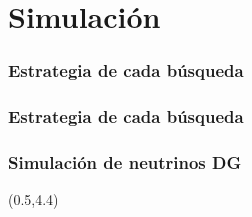 \section[Muestras de entrenamiento]{Simulaci\'on}

\begin{frame}
 \frametitle{Estrategia de cada b\'usqueda}
 \begin{center}
 \end{center}
\end{frame}

\begin{frame}
 \frametitle{Estrategia de cada b\'usqueda}
 \begin{center}
 \end{center}
\end{frame}

\begin{frame}
 \frametitle{Simulaci\'on de neutrinos DG}
 \begin{textblock}{14.5}(0.5,4.4)
 \end{textblock}
 
\end{frame}

